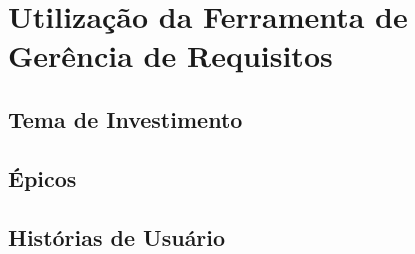 \chapter[Utilização da Ferramenta de Gerência de Requisitos]{Utilização da Ferramenta de Gerência de Requisitos}

\section{Tema de Investimento}

\section{Épicos}

\section{Histórias de Usuário}